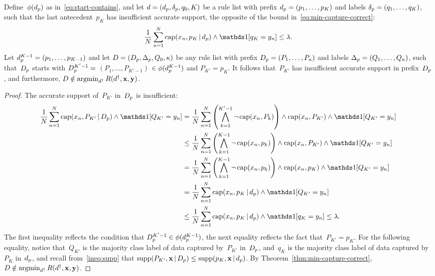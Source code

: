 \begin{proposition}
\label{prop:min-capture-correct}
Define~$\phi(d_p)$ as in~\eqref{eq:start-contains},
and let ${{d} = (d_p, \delta_p, q_0, K)}$ be a rule list
with prefix ${d_p = (p_1, \dots, p_{K})}$
and labels ${\delta_p = (q_1, \dots, q_{K})}$, such that
the last antecedent~$p_{K}$ has insufficient accurate support,
\ie the opposite of the bound in~\eqref{eq:min-capture-correct}:
\begin{align}
\frac{1}{N} \sum_{n=1}^N \Cap(x_n, p_K \given \Prefix) \wedge \one [ q_K = y_n ]
\le \Reg.
\end{align}
%
Let ${d_p^{K-1} = (p_1, \dots, p_{K-1})}$
and let ${{D} = (D_p, \Delta_p, Q_0, \kappa)}$
be any rule list with prefix ${D_p = (P_1, \dots, P_{\kappa})}$
and labels ${\Delta_p = (Q_1, \dots, Q_{\kappa})}$,
such that~$D_p$ starts with ${D_p^{K'-1} =}$
${(P_1, \dots, P_{K'-1})}$ ${\in \phi(d_p^{K-1})}$
and ${P_{K'} = p_{K}}$.
%
It follows that~$P_{K'}$ has insufficient accurate support in
prefix~$D_p$, and furthermore,
${{D} \notin \operatorname*{argmin}_{{d}^\dagger} R({d}^\dagger, \mathbf{x}, \mathbf{y})}$.
\end{proposition}

\begin{proof}
The accurate support of~$P_{K'}$ in~$D_p$ is insufficient:
\begin{align}
\frac{1}{N} \sum_{n=1}^N \Cap(x_n, P_{K'} \given \PrefixB) \wedge \one [ Q_{K'} = y_n ]
&= \frac{1}{N} \sum_{n=1}^N \left( \bigwedge_{k=1}^{K'-1} \neg\, \Cap(x_n, P_k) \right)
   \wedge \Cap(x_n, P_{K'}) \wedge \one [ Q_{K'} = y_n ] \nn \\
&\le \frac{1}{N} \sum_{n=1}^N \left( \bigwedge_{k=1}^{K-1} \neg\, \Cap(x_n, p_k) \right)
   \wedge \Cap(x_n, P_{K'}) \wedge \one [ Q_{K'} = y_n ] \nn \\
&= \frac{1}{N} \sum_{n=1}^N \left( \bigwedge_{k=1}^{K-1} \neg\, \Cap(x_n, p_k) \right)
   \wedge \Cap(x_n, p_K) \wedge \one [ Q_{K'} = y_n ] \nn \\
&= \frac{1}{N} \sum_{n=1}^N \Cap(x_n, p_K \given \Prefix) \wedge \one [ Q_{K'} = y_n ] \nn \\
&\le \frac{1}{N} \sum_{n=1}^N \Cap(x_n, p_K \given \Prefix) \wedge \one [ q_{K} = y_n ]
\le \Reg.
\end{align}
The first inequality reflects the condition that
${D_p^{K'-1} \in \phi(d_p^{K-1})}$,
the next equality reflects the fact that~${P_{K'} = p_K}$.
%
For the following equality, notice that~$Q_{K'}$ is the majority
class label of data captured by~$P_{K'}$ in~$D_p$, and~$q_K$
is the majority class label of data captured by~$P_K$ in~$d_p$,
and recall from~\eqref{ineq:supp} that
${\textnormal{supp}(P_{K'}, \mathbf{x} \,|\, D_p) \le \textnormal{supp}(p_{K}, \mathbf{x} \,|\, d_p)}$.
%
By Theorem~\ref{thm:min-capture-correct},
${{D} \notin \operatorname*{argmin}_{{d}^\dagger} R({d}^\dagger, \mathbf{x}, \mathbf{y})}$.
\end{proof}

